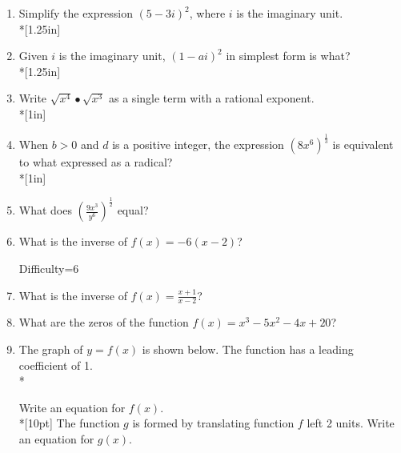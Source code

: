 \documentclass[12pt, oneside]{article}
\begin{document}
\begin{enumerate}
\newpage

\item Simplify the expression $(5 - 3i)^2$, where $i$ is the imaginary unit. \\*[1.25in]

\item Given $i$ is the imaginary unit, $(1-ai)^2$ in simplest form is what?  \\*[1.25in]%


\item Write $\sqrt{x^4} \bullet \sqrt{x^3}$ as a single term with a rational exponent.\\*[1in]

\item When $b>0$ and $d$ is a positive integer, the expression $\displaystyle \left(8x^6 \right)^\frac{1}{3}$ is equivalent to what expressed as a radical? \\*[1in]%

\item What does $\displaystyle \left( \frac{9x^3}{y^6} \right)^\frac{1}{2}$ equal?

\newpage
\item What is the inverse of $f(x)=-6(x-2)$? %

Difficulty=6
\item What is the inverse of $\displaystyle f(x)=\frac{x+1}{x-2}$? %

\item What are the zeros of the function $f(x)=x^3-5x^2-4x+20$? 

\item The graph of $y = f(x)$ is shown below. The function has a leading coefficient of 1.\\*
\begin{center}
\end{center}
Write an equation for $f(x)$.\\*[10pt]
The function $g$ is formed by translating function $f$ left 2 units. Write an equation for $g(x)$.


\end{enumerate}
\end{document}

